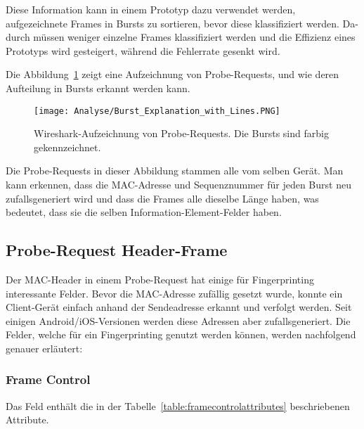 Diese Information kann in einem Prototyp dazu verwendet werden, aufgezeichnete 
Frames in Bursts zu sortieren, bevor diese klassifiziert werden.
Da-durch müssen weniger einzelne Frames klassifiziert werden und die Effizienz eines 
Prototyps wird gesteigert, während die Fehlerrate gesenkt wird.

Die Abbildung~\ref{figure:burstcolor} zeigt eine Aufzeichnung von Probe-Requests, 
und wie deren Aufteilung in Bursts erkannt werden kann.

\begin{figure}[h!]
	\centering
	\texttt{[image: Analyse/Burst\_Explanation\_with\_Lines.PNG]}
    \caption{Wireshark-Aufzeichnung von Probe-Requests. 
    Die Bursts sind farbig gekennzeichnet.
	\label{figure:burstcolor}}
\end{figure}

Die Probe-Requests in dieser Abbildung stammen alle vom selben Gerät. 
Man kann erkennen, dass die MAC-Adresse und Sequenznummer für jeden Burst neu 
zufallsgeneriert wird und dass die Frames alle dieselbe Länge haben, 
was bedeutet, dass sie die selben Information-Element-Felder haben.

\clearpage

\subsection{Probe-Request Header-Frame}
Der MAC-Header in einem Probe-Request hat einige für Fingerprinting 
interessante Felder. 
Bevor die MAC-Adresse zufällig gesetzt wurde, 
konnte ein Client-Gerät einfach anhand der Sendeadresse erkannt und verfolgt 
werden.
Seit einigen Android/iOS-Versionen werden diese Adressen aber zufallsgeneriert.
Die Felder, welche für ein Fingerprinting genutzt werden können, werden
nachfolgend genauer erläutert:

\subsubsection*{Frame Control} 
Das Feld enthält die in der Tabelle~\ref{table:framecontrolattributes}
beschriebenen Attribute.

